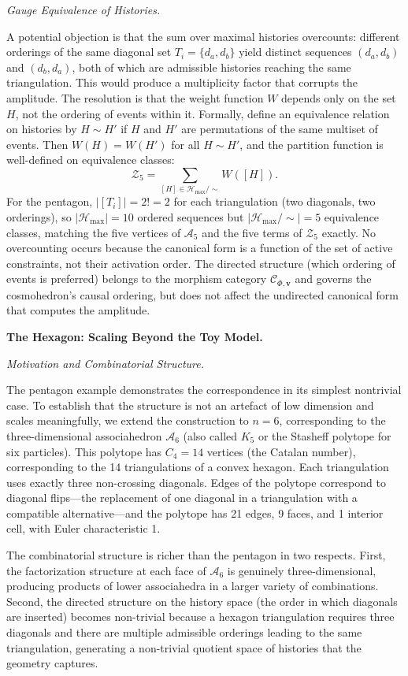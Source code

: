 \documentclass[11pt]{article}
\theoremstyle{plain}
\theoremstyle{definition}
\theoremstyle{remark}
\newcommand{\Ccat}{\mathcal{C}_{\Phi,\mathbf{v}}}
\newcommand{\Hmax}{\mathcal{H}_{\max}}
\begin{document}
\medskip\noindent\textit{Gauge Equivalence of Histories.}

A potential objection is that the sum over maximal histories overcounts: different orderings of the same diagonal set $T_i = \{d_a, d_b\}$ yield distinct sequences $(d_a, d_b)$ and $(d_b, d_a)$, both of which are admissible histories reaching the same triangulation. This would produce a multiplicity factor that corrupts the amplitude. The resolution is that the weight function $W$ depends only on the set $H$, not the ordering of events within it. Formally, define an equivalence relation on histories by $H \sim H'$ if $H$ and $H'$ are permutations of the same multiset of events. Then $W(H) = W(H')$ for all $H \sim H'$, and the partition function is well-defined on equivalence classes: \[
  \mathcal{Z}_5 = \sum_{[H] \in \Hmax/\!\sim} W([H]).
\]
For the pentagon, $|[T_i]| = 2! = 2$ for each triangulation (two diagonals, two orderings), so $|\Hmax| = 10$ ordered sequences but $|\Hmax/\!\sim| = 5$ equivalence classes, matching the five vertices of $\mathcal{A}_5$ and the five terms of $\mathcal{Z}_5$ exactly. No overcounting occurs because the canonical form is a function of the set of active constraints, not their activation order. The directed structure (which ordering of events is preferred) belongs to the morphism category $\Ccat$ and governs the cosmohedron's causal ordering, but does not affect the undirected canonical form that computes the amplitude.

\bigskip\noindent\textbf{The Hexagon: Scaling Beyond the Toy Model.}
\label{sec:hexagon}

\medskip\noindent\textit{Motivation and Combinatorial Structure.}

The pentagon example demonstrates the correspondence in its simplest nontrivial case. To establish that the structure is not an artefact of low dimension and scales meaningfully, we extend the construction to $n = 6$, corresponding to the three-dimensional associahedron $\mathcal{A}_6$ (also called $K_5$ or the Stasheff polytope for six particles). This polytope has $C_4 = 14$ vertices (the Catalan number), corresponding to the 14 triangulations of a convex hexagon. Each triangulation uses exactly three non-crossing diagonals. Edges of the polytope correspond to diagonal flips---the replacement of one diagonal in a triangulation with a compatible alternative---and the polytope has 21 edges, 9 faces, and 1 interior cell, with Euler characteristic 1.

The combinatorial structure is richer than the pentagon in two respects. First, the factorization structure at each face of $\mathcal{A}_6$ is genuinely three-dimensional, producing products of lower associahedra in a larger variety of combinations. Second, the directed structure on the history space (the order in which diagonals are inserted) becomes non-trivial because a hexagon triangulation requires three diagonals and there are multiple admissible orderings leading to the same triangulation, generating a non-trivial quotient space of histories that the geometry captures.
\end{document}
